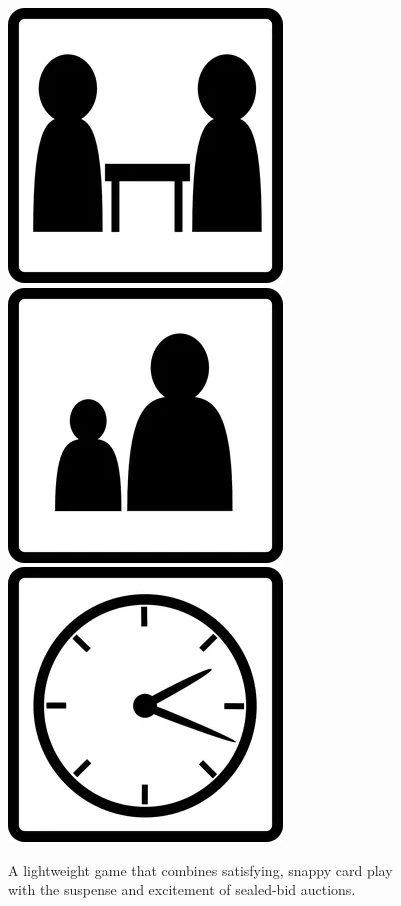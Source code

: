 \documentclass[a5paper, DIV=18, 12pt]{scrartcl}
\begin{document}
\includegraphics[scale=0.125]{Images/Icons/player_count_icon.png} {\setmainfont[Scale=1.4]{Tex Gyre Schola-Bold}\Huge \raisebox{6.55pt}{\textcolor{black}{:\ 2-5}}} \hfill \includegraphics[scale=0.125]{Images/Icons/player_age_icon.png} {\setmainfont[Scale=1.4]{Tex Gyre Schola-Bold}\Huge \raisebox{6.55pt}{\textcolor{black}{:\ 8+}}}\hfill \includegraphics[scale=0.125]{Images/Icons/playtime_icon.png} {\setmainfont[Scale=1.4]{Tex Gyre Schola-Bold}\Huge \raisebox{6.55pt}{\textcolor{black}{:\ 30}}}
\vspace{-0.25ex}
\flushleft
\begin{center}{\setmainfont[Scale=1.0]{Tex Gyre Schola}A lightweight game that combines satisfying, snappy card play\\with the suspense and excitement of sealed-bid auctions.}
\end{center}
\vspace{-1ex}
\end{document}
